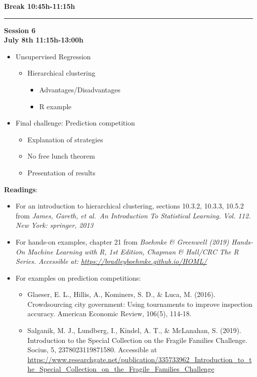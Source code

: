 \documentclass[
]{book}
\providecommand{\tightlist}{%
  \setlength{\itemsep}{0pt}\setlength{\parskip}{0pt}}
\begin{document}
\textbf{Break 10:45h-11:15h}

\begin{center}\rule{0.5\linewidth}{\linethickness}\end{center}

\textbf{Session 6}\\
\textbf{July 8th 11:15h-13:00h}

\begin{itemize}
\tightlist
\item
  Unsupervised Regression

  \begin{itemize}
  \tightlist
  \item
    Hierarchical clustering

    \begin{itemize}
    \tightlist
    \item
      Advantages/Disadvantages
    \item
      R example
    \end{itemize}
  \end{itemize}
\item
  Final challenge: Prediction competition

  \begin{itemize}
  \tightlist
  \item
    Explanation of strategies
  \item
    No free lunch theorem
  \item
    Presentation of results
  \end{itemize}
\end{itemize}

\textbf{Readings}:

\begin{itemize}
\item
  For an introduction to hierarchical clustering, sections 10.3.2, 10.3.3, 10.5.2 from \emph{James, Gareth, et al.~An Introduction To Statistical Learning. Vol. 112. New York: springer, 2013}
\item
  For hands-on examples, chapter 21 from \emph{Boehmke \& Greenwell (2019) Hands-On Machine Learning with R, 1st Edition, Chapman \& Hall/CRC The R Series. Accessible at: \url{https://bradleyboehmke.github.io/HOML/}}
\item
  For examples on prediction competitions:

  \begin{itemize}
  \item
    Glaeser, E. L., Hillis, A., Kominers, S. D., \& Luca, M. (2016). Crowdsourcing city government: Using tournaments to improve inspection accuracy. American Economic Review, 106(5), 114-18.
  \item
    Salganik, M. J., Lundberg, I., Kindel, A. T., \& McLanahan, S. (2019). Introduction to the Special Collection on the Fragile Families Challenge. Socius, 5, 2378023119871580. Accessible at \url{https://www.researchgate.net/publication/335733962_Introduction_to_the_Special_Collection_on_the_Fragile_Families_Challenge}
  \end{itemize}
\end{itemize}
\end{document}
